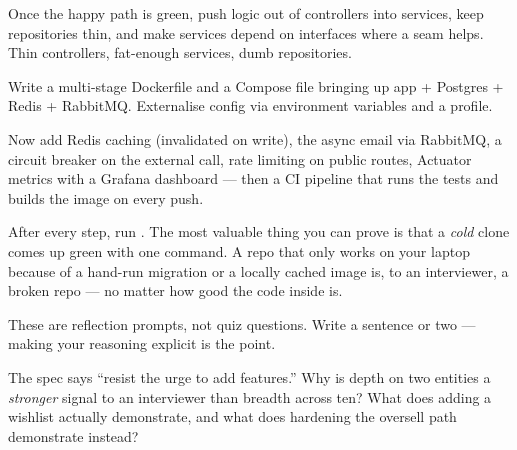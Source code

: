Once the happy path is green, push logic out of controllers into services, keep repositories thin, and make services depend on interfaces where a seam helps. Thin controllers, fat-enough services, dumb repositories.

Write a multi-stage Dockerfile and a Compose file bringing up app + Postgres + Redis + RabbitMQ. Externalise config via environment variables and a  profile.

Now add Redis caching (invalidated on write), the async email via RabbitMQ, a circuit breaker on the external call, rate limiting on public routes, Actuator metrics with a Grafana dashboard --- then a CI pipeline that runs the tests and builds the image on every push.

\begin{prodtip}
After every step, run . The most valuable thing you can prove is that a \emph{cold} clone comes up green with one command. A repo that only works on your laptop because of a hand-run migration or a locally cached image is, to an interviewer, a broken repo --- no matter how good the code inside is.
\end{prodtip}


These are reflection prompts, not quiz questions. Write a sentence or two --- making your reasoning explicit is the point.

\begin{thinkbox}
The spec says ``resist the urge to add features.'' Why is depth on two entities a \emph{stronger} signal to an interviewer than breadth across ten? What does adding a wishlist actually demonstrate, and what does hardening the oversell path demonstrate instead?
\end{thinkbox}

